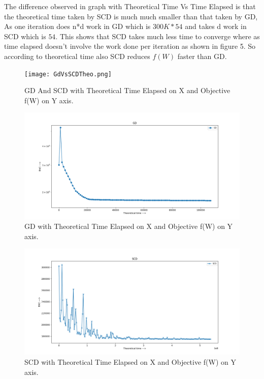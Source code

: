 \documentclass[a4paper,11pt]{article}
\begin{document}
\begin{mlsolution}
The difference observed in graph with Theoretical Time Vs Time Elapsed is that the theoretical time taken by SCD is much much smaller than that taken by GD, As one iteration does n*d work in GD which is $300K * 54$ and takes d work in SCD which is $54$. This shows that SCD takes much less time to converge where as time elapsed doesn't involve the work done per iteration as shown in figure 5. So according to theoretical time also SCD reduces $f(W)$ faster than GD.

\begin{figure}[th]%
\centering
\texttt{[image: GdVsSCDTheo.png]}%

\caption{GD And SCD with Theoretical Time Elapsed on X and Objective f(W) on Y axis.}%
\label{fig:GD4}%
\end{figure}

\begin{figure}[th]%
\centering
\includegraphics[width=1.2\columnwidth]{GD-theo.png}%

\caption{GD with Theoretical Time Elapsed on X and Objective f(W) on Y axis.}%
\label{fig:GD2}%
\end{figure}

\begin{figure}[th]%
\centering
\includegraphics[width=1.2\columnwidth]{SCD-theo.png}%

\caption{SCD with Theoretical Time Elapsed on X and Objective f(W) on Y axis.}%
\label{fig:SCD2}%
\end{figure}

\end{mlsolution}
					
\end{document}
